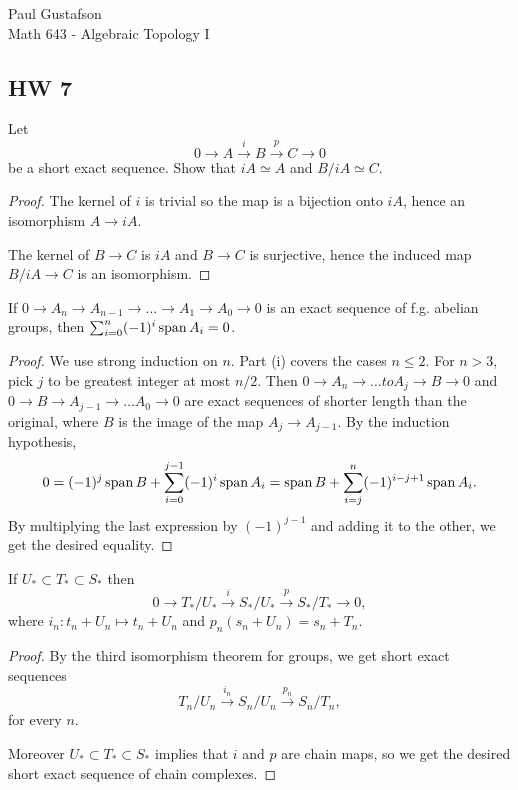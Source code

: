 \documentclass{article}
\begin{document}
\noindent Paul Gustafson\\
\noindent Math 643 - Algebraic Topology I


\subsection*{HW 7}
 Let 
$$0  \to A \overset i \to B \overset p \to C \to 0$$
be a short exact sequence. Show that $iA \simeq A$ and $B/iA \simeq C$.
\begin{proof}
The kernel of $i$ is trivial so the map is a bijection onto $iA$, hence an isomorphism $A \to iA$.

The kernel of $B \to C$ is $iA$ and $B \to C$ is surjective, hence the induced map $B/iA \to C$ is an isomorphism.
\end{proof}

 If $0 \to A_n \to A_{n-1} \to \ldots \to A_1 \to A_0 \to 0$ is an exact sequence of f.g. abelian groups, then
$\sum_{i=0}^n (-1)^i \operatorname{span} A_i = 0$.
\begin{proof}
We use strong induction on $n$. Part (i) covers the cases $n \le 2$. For $n > 3$, pick $j$ to be greatest integer at most $n/2$.
Then $0 \to A_n \to \ldots to A_j \to B \to 0$ and $0 \to B \to A_{j-1} \to \ldots A_0 \to 0$ are exact sequences of shorter length than the original,
where $B$ is the image of the map $A_j \to A_{j-1}$.  By the induction hypothesis, 
$$0 = (-1)^j \operatorname{span} B + \sum_{i=0}^{j-1} (-1)^i \operatorname{span} A_i = \operatorname{span} B + \sum_{i=j}^{n} (-1)^{i-j+1} \operatorname{span} A_i.$$
By multiplying the last expression by $(-1)^{j-1}$ and adding it to the other, we get the desired equality.
\end{proof}

 If $U_* \subset T_* \subset S_*$ then
$$0 \to T_*/U_*  \overset{i}{\to} S_*/U_* \overset{p}{\to} S_*/T_* \to 0,$$
where $i_n: t_n + U_n \mapsto t_n + U_n$ and $p_n(s_n + U_n) = s_n + T_n$.
\begin{proof}
By the third isomorphism theorem for groups, we get short exact sequences
$$T_n/U_n \overset{i_n}{\to} S_n/U_n \overset{p_n}{\to} S_n/T_n,$$
for every $n$.

Moreover $U_* \subset T_* \subset S_*$ implies that $i$ and $p$ are chain maps,
so we get the desired short exact sequence of chain complexes.
\end{proof}
\end{document}

